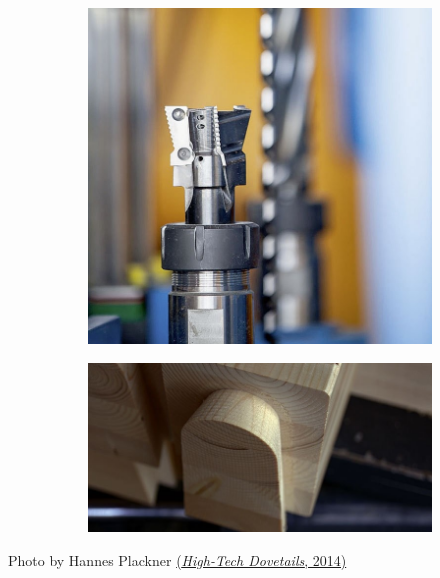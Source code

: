 \documentclass[11pt]{book}
\begin{document}
\begin{figure}[H]
\centering
\begin{subfigure}[b]{0.45\textwidth}
\centering
\includegraphics[width=\textwidth]{./images/image2.jpg}
\end{subfigure}
\hfill
\begin{subfigure}[b]{0.45\textwidth}
\centering
\includegraphics[width=\textwidth]{./images/image15.jpg}
\end{subfigure}
\end{figure}


{\footnotesize Photo by Hannes Plackner \href{https://www.zotero.org/google-docs/?ijZDtG}{(}\href{https://www.zotero.org/google-docs/?ijZDtG}{\textit{High-Tech Dovetails}\href{https://www.zotero.org/google-docs/?ijZDtG}{}, 2014)}}
\end{document}
